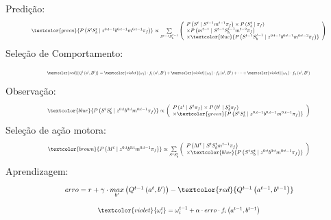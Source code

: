 \documentclass{beamer}
\begin{document}
\begin{frame}
Predição:
$$
    \resizebox{.9\hsize}{!}{ $
    		\textcolor{green}{ P \left( S^t S_b^t \mid z^{0: t-1} b^{0: t-1} m^{0: t-1} \pi_f \right) } \propto \sum\limits_{S^{t-1} S_b^{t-1}}
        \left(
            \begin{array}{l}
                P \left( S^t \mid S^{t-1} m^{t-1} \pi_f \right) \times P \left( S_b^t \mid \pi_f \right) \\
                \times P \left( m^{t-1} \mid S^{t-1} S_b^{t-1} m^{t-2} \pi_f \right)\\
                \times \textcolor{blue}{ P \left( S^{t-1} S_b^{t-1} \mid z^{0: t-1} b^{0: t-1} m^{0: t-2} \pi_f \right) }
            \end{array}
        \right) $}
$$\pause
Seleção de Comportamento:
$$
    \resizebox{.8\hsize}{!}{ $
    		\textcolor{red}{ Q^t \left( a^t, B^t \right) } = \textcolor{violet}{ \omega_1 } \cdot f_1 \left( a^t, B^t \right) + \textcolor{violet}{ \omega_2 } \cdot f_2 \left( a^t, B^t \right) + \cdots + \textcolor{violet}{ \omega_n } \cdot f_n \left( a^t, B^t \right)
    $}
$$\pause
Observação:
$$
    \resizebox{.8\hsize}{!}{ $
    		\textcolor{blue}{ P \left( S^t S_b^t \mid z^{0: t} b^{0: t} m^{0: t-1} \pi_f \right) } \propto
        \left(
            \begin{array}{l}
                P \left( z^t \mid S^t \pi_f \right) \times P \left( b^t \mid S_b^t \pi_f \right) \\
                \times \textcolor{green}{ P \left( S^t S_b^t \mid z^{0: t-1} b^{0: t-1} m^{0: t-1} \pi_f \right) }
            \end{array}
        \right)
    $}
$$\pause
Seleção de ação motora:
$$
    \resizebox{.8\hsize}{!}{ $
    		\textcolor{brown}{ P \left( M^t \mid z^{0: t} b^{0: t} m^{0: t-1} \pi_f \right) } \propto \sum\limits_{S^t S_b^t}
        \left(
            \begin{array}{l}
                P \left( M^t \mid S^t S_b^t m^{t-1} \pi_f \right)\\
                \times \textcolor{blue}{ P \left( S^t S_b^t \mid z^{0: t} b^{0: t} m^{0: t-1} \pi_f \right) }
            \end{array}
        \right)
    $}
$$\pause
Aprendizagem:
$$
    \resizebox{.7\hsize}{!}{ $
    		erro = r + \gamma \cdot \underset{b'}{max} \left( Q^{t-1} \left( a^t, b' \right) \right) - \textcolor{red}{ Q^{t-1} \left( a^{t-1}, b^{t-1} \right) }
    $}
$$
$$
    \resizebox{.5\hsize}{!}{ $
    		\textcolor{violet}{ \omega_i^t } = \omega_i^{t-1} + \alpha \cdot erro \cdot f_i \left( a^{t-1}, b^{t-1} \right)
    $}
$$
\end{frame}
\end{document}
